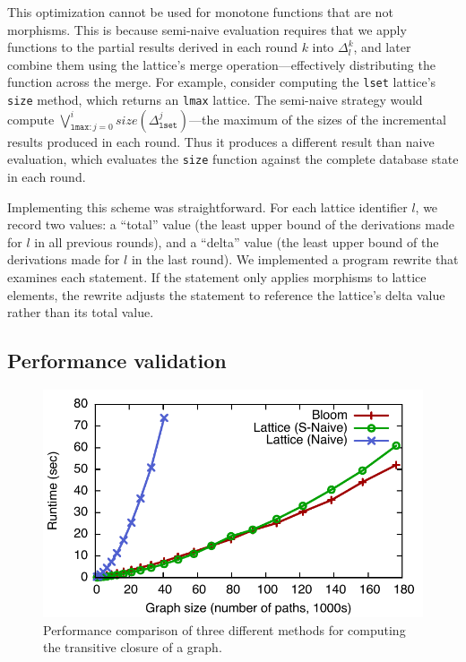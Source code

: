 This optimization cannot be used for monotone functions that are not
morphisms. This is because semi-naive evaluation requires that we apply
functions to the partial results derived in each round $k$ into $\Delta_l^k$,
and later combine them using the lattice's merge operation---effectively
distributing the function across the merge.  For example, consider computing the
\texttt{lset} lattice's \texttt{size} method, which returns an \texttt{lmax}
lattice. The semi-naive strategy would compute
$\bigvee_{\mathtt{lmax}:j=0}^i size(\Delta^j_{\mathtt{lset}})$---the maximum of
the sizes of the incremental results produced in each round.  Thus it produces a
different result than naive evaluation, which evaluates the \texttt{size}
function against the complete database state in each round.

Implementing this scheme was straightforward. For each lattice identifier $l$,
we record two values: a ``total'' value (the least upper bound of the
derivations made for $l$ in all previous rounds), and a ``delta'' value (the
least upper bound of the derivations made for $l$ in the last round). We
implemented a program rewrite that examines each \lang statement. If the
statement only applies morphisms to lattice elements, the rewrite adjusts the
statement to reference the lattice's delta value rather than its total value.


\subsection{Performance validation}
\label{sec:lattice-perf}

\begin{figure}[t]
\includegraphics[width=\linewidth]{fig/sn_perf}
\caption{Performance comparison of three different methods for computing the
  transitive closure of a graph.}
\label{fig:tc-perf-graph}
\end{figure}

